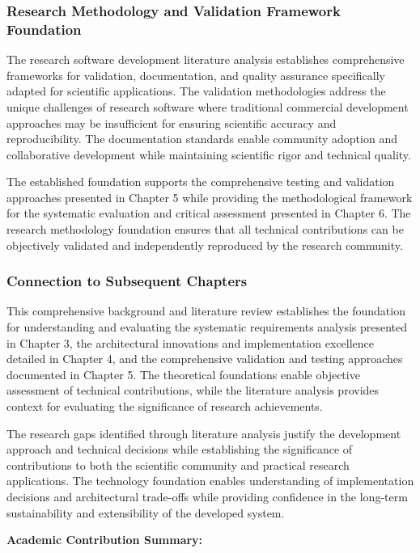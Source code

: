 \documentclass[12pt,a4paper]{article}
\begin{document}
\subsubsection{Research Methodology and Validation Framework Foundation}

The research software development literature analysis establishes comprehensive frameworks for validation,
documentation, and quality assurance specifically adapted for scientific applications. The validation methodologies
address the unique challenges of research software where traditional commercial development approaches may be
insufficient for ensuring scientific accuracy and reproducibility. The documentation standards enable community adoption
and collaborative development while maintaining scientific rigor and technical quality.

The established foundation supports the comprehensive testing and validation approaches presented in Chapter 5 while
providing the methodological framework for the systematic evaluation and critical assessment presented in Chapter 6. The
research methodology foundation ensures that all technical contributions can be objectively validated and independently
reproduced by the research community.

\subsubsection{Connection to Subsequent Chapters}

This comprehensive background and literature review establishes the foundation for understanding and evaluating the
systematic requirements analysis presented in Chapter 3, the architectural innovations and implementation excellence
detailed in Chapter 4, and the comprehensive validation and testing approaches documented in Chapter 5. The theoretical
foundations enable objective assessment of technical contributions, while the literature analysis provides context for
evaluating the significance of research achievements.

The research gaps identified through literature analysis justify the development approach and technical decisions while
establishing the significance of contributions to both the scientific community and practical research applications. The
technology foundation enables understanding of implementation decisions and architectural trade-offs while providing
confidence in the long-term sustainability and extensibility of the developed system.

\textbf{Academic Contribution Summary:}
\end{document}
